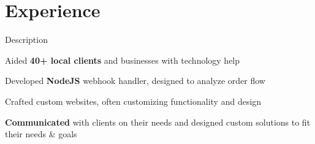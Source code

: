 \documentclass[letterpaper]{deedy-resume} %
\begin{document}
\begin{minipage}[t]{0.66\textwidth}


\sectionspace %


\section{Experience}


\vspace{\topsep} %
\begin{tightitemize}
\item Description
\end{tightitemize}

\sectionspace %


\vspace{\topsep} %
\begin{tightitemize}
\item Aided \textbf{40+ local clients} and businesses with technology help
\item Developed \textbf{NodeJS} webhook handler, designed to analyze order flow
\item Crafted custom websites, often customizing functionality and design
\item \textbf{Communicated} with clients on their needs and designed custom solutions to fit their needs \& goals
\end{tightitemize}

\sectionspace %



\end{minipage}
\end{document}

